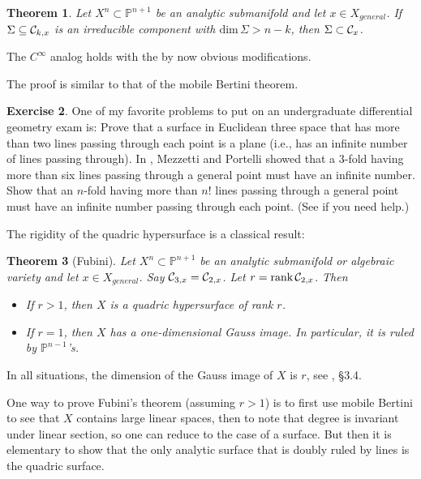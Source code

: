 \documentclass[11pt]{amsart}
\newtheorem{theorem}{Theorem}[section]
\theoremstyle{definition}
\newtheorem{exercise}[theorem]{Exercise}
\theoremstyle{remark}
\numberwithin{equation}{section}
\def\trank{\text{rank}}
\def\pp#1{\mathbb P^{#1}}
\def\pp#1{{\mathbb P}^{#1}}
\def\tdim{\rm dim}
\def\tdim{\text{dim}\,}
\def\trank{\text{rank}\,}
\begin{document}
\begin{theorem}\cite{Lnfac} \label{linethm}
 Let $X^n\subset\pp{n+1}$ be an analytic submanifold
  and let $x\in X_{general}$. If
 $\Sigma\subseteq {\mathcal C}_{k,x}$ is an irreducible component
with $\tdim \Sigma >n-k$, then
$\Sigma\subset {\mathcal C}_x$.
\end{theorem}

The $C^{\infty}$ analog holds with the by now obvious modifications.

The proof is similar to that of the mobile Bertini theorem.

\begin{exercise}One of my favorite problems to put on an undergraduate differential geometry
  exam is: Prove that   a surface in Euclidean three
space that has more than two lines passing through each point  is a plane
(i.e., has an infinite number of lines passing through). In \cite{MP}, Mezzetti
and Portelli showed that a $3$-fold having more than six lines
passing through a general point
must have an infinite number. Show that an $n$-fold having more than $n!$ lines passing
through a general point must have an infinite number passing through each point.
(See \cite{Lnfac} if you need help.)
\end{exercise}

\medskip

The rigidity of the quadric hypersurface is a classical result:

\begin{theorem}[Fubini] Let $X^n\subset\pp{n+1}$ be an analytic submanifold
or algebraic variety and let $x\in X_{general}$. Say
 ${\mathcal C}_{3,x}={\mathcal C}_{2,x}$. Let $r=\trank\cC_{2,x}$. Then
 \begin{itemize}
 \item If $r>1$, then $X$ is a quadric hypersurface of rank $r$.
 \item If $r=1$, then $X$ has a one-dimensional Gauss image. In
 particular, it is ruled by $\pp{n-1}$'s.
 \end{itemize}
\end{theorem}

In all situations, the dimension of the Gauss image of $X$ is $r$,
see \cite{EDSBK}, \S 3.4.

One way to prove Fubini's theorem (assuming $r>1$) is to first use   mobile
Bertini to see that $X$ contains large linear spaces, then to note that
degree is invariant under linear section, so one can reduce to the case of
a surface. But then it is elementary to show that the only
analytic surface that
is doubly ruled by lines is the quadric surface.
\end{document}
